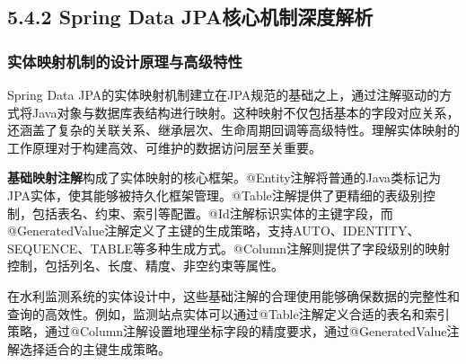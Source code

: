 \subsection{5.4.2 Spring Data JPA核心机制深度解析}\label{spring-data-jpaux6838ux5fc3ux673aux5236ux6df1ux5ea6ux89e3ux6790}

\subsubsection{实体映射机制的设计原理与高级特性}\label{ux5b9eux4f53ux6620ux5c04ux673aux5236ux7684ux8bbeux8ba1ux539fux7406ux4e0eux9ad8ux7ea7ux7279ux6027}

Spring Data JPA的实体映射机制建立在JPA规范的基础之上，通过注解驱动的方式将Java对象与数据库表结构进行映射。这种映射不仅包括基本的字段对应关系，还涵盖了复杂的关联关系、继承层次、生命周期回调等高级特性。理解实体映射的工作原理对于构建高效、可维护的数据访问层至关重要。

\textbf{基础映射注解}构成了实体映射的核心框架。@Entity注解将普通的Java类标记为JPA实体，使其能够被持久化框架管理。@Table注解提供了更精细的表级别控制，包括表名、约束、索引等配置。@Id注解标识实体的主键字段，而@GeneratedValue注解定义了主键的生成策略，支持AUTO、IDENTITY、SEQUENCE、TABLE等多种生成方式。@Column注解则提供了字段级别的映射控制，包括列名、长度、精度、非空约束等属性。

在水利监测系统的实体设计中，这些基础注解的合理使用能够确保数据的完整性和查询的高效性。例如，监测站点实体可以通过@Table注解定义合适的表名和索引策略，通过@Column注解设置地理坐标字段的精度要求，通过@GeneratedValue注解选择适合的主键生成策略。

